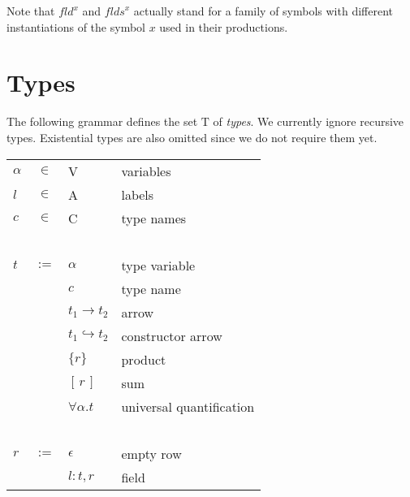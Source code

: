 \documentclass[twoside]{article}
\newcommand{\conarrow}{\hookrightarrow}
\newcommand{\x}[1]{\mathit{#1}}
\newcommand{\f}[1]{\mbox{#1}}
\newcommand{\fld}{\x{fld}}
\newcommand{\flds}{\x{flds}}
\begin{document}
Note that $\fld^x$ and $\flds^x$ actually stand for a family of symbols with different instantiations of the symbol $x$ used in their productions.


\section{Types}
\label{types}

The following grammar defines the set $\f{T}$ of {\em types}. We currently ignore recursive types. Existential types are also omitted since we do not require them yet.

\begin{center}
\begin{tabular}{lcll}
$\alpha$&$\in$&	\f{V}				& variables \\
$l$	&$\in$&	\f{A}				& labels \\
$c$	&$\in$&	\f{C}				& type names \\
\ \\

$t$	&$:=$&	$\alpha$			& type variable \\
	&&	$c$				& type name \\
	&&	$t_1 \to t_2$			& arrow \\
	&&	$t_1 \conarrow t_2$		& constructor arrow \\
	&&	$\{r\}$				& product \\
	&&	$[\,r\,]$			& sum \\
	&&	$\forall \alpha . t$		& universal quantification \\
\ \\

$r$	&$:=$&	$\epsilon$			& empty row \\
	&&	$l:t,r$				& field \\
%
\end{tabular}
\end{center}
\end{document}
